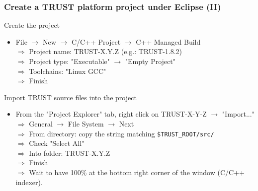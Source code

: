 \documentclass[10pt, hyperref={unicode=true,pdfusetitle, bookmarks=true,bookmarksnumbered=false,bookmarksopen=false, breaklinks=false,pdfborder={0 0 1},backref=true,colorlinks=true,linkcolor=darkblue,pageanchor, urlcolor=darkblue}]{beamer}
\begin{document}
\begin{frame}
\frametitle{Create a TRUST platform project under Eclipse (II)}

\begin{exampleblock}{Create the project}
\begin{itemize}
\item File $\rightarrow$ New $\rightarrow$ C/C++ Project $\rightarrow$ C++ Managed Build \\
 $\Rightarrow$ Project name: TRUST-X.Y.Z (e.g.: TRUST-1.8.2) \\
 $\Rightarrow$ Project type: "Executable"  $\rightarrow$  "Empty Project" \\
 $\Rightarrow$ Toolchains: "Linux GCC" \\
 $\Rightarrow$ Finish
\end{itemize}
\end{exampleblock}

\begin{exampleblock}{Import TRUST source files into the project}
\begin{itemize}
\item From the "Project Explorer" tab, right click on TRUST-X-Y-Z  $\rightarrow$  "Import..." \\
  $\Rightarrow$ General  $\rightarrow$ File System $\rightarrow$ Next \\
  $\Rightarrow$ From directory: copy the string matching \texttt{\$TRUST\_ROOT/src/} \\
  $\Rightarrow$ Check "Select All" \\
  $\Rightarrow$ Into folder: TRUST-X.Y.Z \\
  $\Rightarrow$ Finish \\
  $\Rightarrow$ Wait to have 100\% at the bottom right corner of the window  (C/C++ indexer).
\end{itemize}
\end{exampleblock}

\end{frame}
\end{document}
